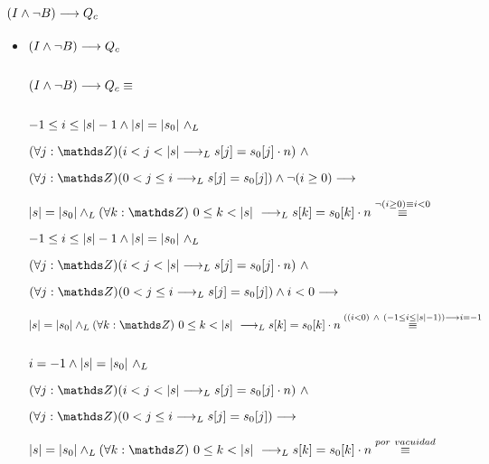 \documentclass{article}
\begin{document}
\subsection*{$(I \wedge \neg B) \longrightarrow Q_{c}$}

    \begin{itemize}
        \item $(I \wedge \neg B) \longrightarrow Q_{c}$

        $ $

        $(I \wedge \neg B) \longrightarrow Q_{c} \equiv$

        $ $

        $-1 \leq i \leq |s| - 1 \wedge |s| = |s_0|\ \land _L$

\quad       $(\forall j: \ent)( i < j < \longitud{s} \implicaLuego s[j] = s_0[j] \cdot n)\ \wedge$

\quad       $(\forall j: \ent)( 0 < j \leq i \implicaLuego s[j] = s_0[j]) \wedge \neg (i \geq 0) \implica $

\qquad          $\longitud{s} = \longitud{s_0} \yLuego \paraTodo{k}{0}{\longitud{s}} \implicaLuego s[k] = s_0[k] \cdot n \stackrel{\neg(i \geq 0) \equiv i < 0}{\equiv} $

\newpage

        $-1 \leq i \leq |s| - 1 \wedge |s| = |s_0|\ \land _L$

\quad       $(\forall j: \ent)( i < j < \longitud{s} \implicaLuego s[j] = s_0[j] \cdot n)\ \wedge$

\quad       $(\forall j: \ent)( 0 < j \leq i \implicaLuego s[j] = s_0[j]) \wedge i < 0 \implica $

\qquad          $\longitud{s} = \longitud{s_0} \yLuego \paraTodo{k}{0}{\longitud{s}} \implicaLuego s[k] = s_0[k] \cdot n \stackrel{((i < 0)\ \wedge\ (-1 \leq i \leq \longitud{s} - 1)) \implica i = -1}{\equiv} $

        $ $

        $ i = -1 \wedge |s| = |s_0|\ \land _L$

\quad       $(\forall j: \ent)( i < j < \longitud{s} \implicaLuego s[j] = s_0[j] \cdot n)\ \wedge$

\quad       $(\forall j: \ent)( 0 < j \leq i \implicaLuego s[j] = s_0[j]) \implica $

\qquad          $\longitud{s} = \longitud{s_0} \yLuego \paraTodo{k}{0}{\longitud{s}} \implicaLuego s[k] = s_0[k] \cdot n \stackrel{por\ vacuidad}{\equiv} $

        $ $ 


\end{itemize}
\end{document}

